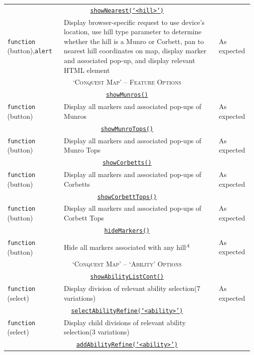 \documentclass[11pt, english]{article}
\begin{document}
\begin{center}
\begin{longtable}{p{3cm}p{8cm}p{2cm}}
		\multicolumn{3}{c}{\underline{\texttt{showNearest(`<hill>')}}}\\
		\texttt{function} (button),\newline \texttt{alert} & Display browser-specific request to use device's location, use hill type parameter to determine whether the hill is a Munro or Corbett, pan to nearest hill coordinates on map, display marker and associated pop-up, and display relevant HTML element & As expected\\
		\hline
		\multicolumn{3}{c}{\textsc{`Conquest Map' -- Feature Options}}\\
		\hline
		\multicolumn{3}{c}{\underline{\texttt{showMunros()}}}\\
		\texttt{function} (button) & Display all markers and associated pop-ups of Munros & As expected\\
		\multicolumn{3}{c}{\underline{\texttt{showMunroTops()}}}\\
		\texttt{function} (button) & Display all markers and associated pop-ups of Munro Tops & As expected\\
		\multicolumn{3}{c}{\underline{\texttt{showCorbetts()}}}\\
		\texttt{function} (button) & Display all markers and associated pop-ups of Corbetts & As expected\\
		\multicolumn{3}{c}{\underline{\texttt{showCorbettTops()}}}\\
		\texttt{function} (button) & Display all markers and associated pop-ups of Corbett Tops & As expected\\
		\multicolumn{3}{c}{\underline{\texttt{hideMarkers()}}}\\
		\texttt{function} (button) & Hide all markers associated with any hill$^{A}$ & As expected\\
		\hline
		\multicolumn{3}{c}{\textsc{`Conquest Map' -- `Ability' Options}}\\
		\hline
		\multicolumn{3}{c}{\underline{\texttt{showAbilityListCont()}}}\\
		\texttt{function} (select) & Display division of relevant ability selection\newline (7 variations) & As expected\\
		\multicolumn{3}{c}{\underline{\texttt{selectAbilityRefine(`<ability>')}}}\\
		\texttt{function} (select) & Display child divisions of relevant ability selection\newline (3 variations)\\
		\multicolumn{3}{c}{\underline{\texttt{addAbilityRefine(`<ability>')}}}\\

\end{longtable}
\end{center}
\end{document}
